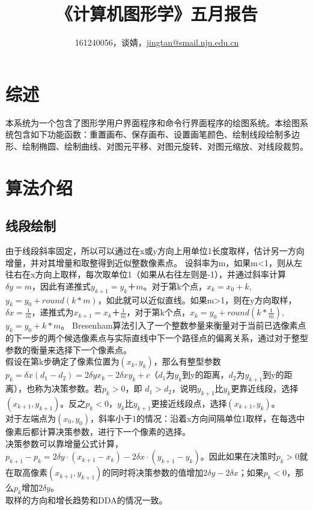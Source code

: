 \documentclass[a4paper,UTF8]{article}
\theoremstyle{definition}
\begin{document}
\title{\textbf{《计算机图形学》五月报告}}
\author{161240056，谈婧，\href{mailto:jingtan@smail.nju.edu.cn}{jingtan@smail.nju.edu.cn}}
\maketitle

\section{综述}
本系统为一个包含了图形学用户界面程序和命令行界面程序的绘图系统。本绘图系统包含如下功能函数：重置画布、保存画布、设置画笔颜色、绘制线段绘制多边形、绘制椭圆、绘制曲线、对图元平移、对图元旋转、对图元缩放、对线段裁剪。

\section{算法介绍}
\subsection{线段绘制}
由于线段斜率固定，所以可以通过在x或y方向上用单位1长度取样，估计另一方向增量，并对其增量和取整得到近似整数像素点。
设斜率为m，如果m<1，则从左往右在x方向上取样，每次取单位1（如果从右往左则是-1），并通过斜率计算$\delta y = m$，因此有递推式$y_{k+1}=y_k＋m$。对于第k个点，$x_k = x_0 + k$, $y_k = y_0+round(k*m)$，如此就可以近似直线。如果m>1，则在y方向取样，$\delta x = \frac{1}{m}$，递推式为$x_{k+1}=x_k＋\frac{1}{m}$，对于第k个点，$x_k = y_0+ round(k*\frac{1}{m})$, $y_k = y_0 + k*m$。
Bresenham算法引入了一个整数参量来衡量对于当前已选像素点的下一步的两个候选像素点与实际直线中下一个路径点的偏离关系，通过对于整型参数的衡量来选择下一个像素点。\\
假设在第k步确定了像素位置为$(x_k,y_k)$，那么有整型参数$p_k = \delta x(d_1-d_2) = 2\delta yx_k - 2\delta x y_k + c$（$d_1$为$y_k$到y的距离，$d_2$为$y_{k+1}$到y的距离），也称为决策参数。若$p_k > 0$，即 $d_1 > d_2$，说明$y_{k+1}$比$y_k$更靠近线段，选择$(x_{k+1}, y_{k+1})$。反之$p_k < 0$，$y_k$比$y_{k+1}$更接近线段点，选择$(x_{k+1}, y_{k})$。\\
对于左端点为$(x_0,y_0)$，斜率小于1的情况：沿着x方向间隔单位1取样，在每选中像素后都计算决策参数，进行下一个像素的选择。\\
决策参数可以靠增量公式计算，$p_{k+1}-p_k = 2\delta y \cdot (x_{k+1}-x_k) - 2\delta x \cdot (y_{k+1}-y_k)$。因此如果在决策时$p_k>0$就在取高像素$(x_{k+1},y_{k+1})$的同时将决策参数的值增加$2\delta y - 2 \delta x$；如果$p_k < 0$，那么$p_k$增加$2\delta y$。\\
取样的方向和增长趋势和DDA的情况一致。
\end{document}
